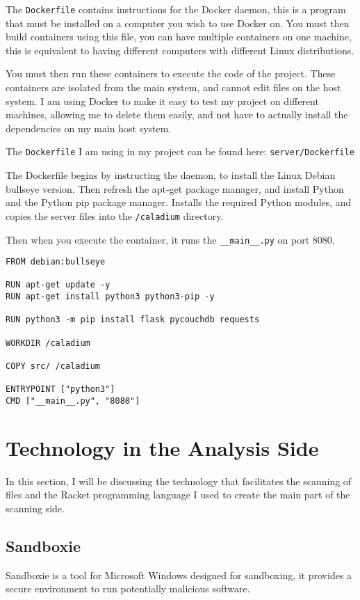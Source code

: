 The \texttt{Dockerfile} contains instructions for the Docker daemon,
this is a program that must be installed on a computer you wish to use Docker on.
You must then build containers using this file,
you can have multiple containers on one machine,
this is equivalent to having different computers with different Linux distributions.

You must then run these containers to
execute the code of the project.
These containers are isolated from the main system, and cannot edit files on the host system.
I am using Docker to make it easy to test my project on different machines,
allowing me to delete them easily,
and not have to actually install the dependencies on my main host system.

The \texttt{Dockerfile} I am using in my project can be found here:
\texttt{server/Dockerfile}

The Dockerfile begins by instructing the daemon,
to install the Linux Debian bullseye version.
Then refresh the apt-get package manager,
and install Python and the Python pip package manager.
Installs the required Python modules,
and copies the server files into the \texttt{/caladium} directory.

Then when you execute the container,
it runs the \texttt{\_\_main\_\_.py} on port 8080.

\begin{lstlisting}
FROM debian:bullseye

RUN apt-get update -y
RUN apt-get install python3 python3-pip -y

RUN python3 -m pip install flask pycouchdb requests

WORKDIR /caladium

COPY src/ /caladium

ENTRYPOINT ["python3"]
CMD ["__main__.py", "8080"]
\end{lstlisting}

\section{Technology in the Analysis Side}
In this section, I will be discussing the technology that
facilitates the scanning of files and the Racket programming language
I used to create the main part of the scanning side.

\subsection{Sandboxie}
Sandboxie is a tool for Microsoft Windows designed for sandboxing,
it provides a secure environment to run potentially malicious software.

